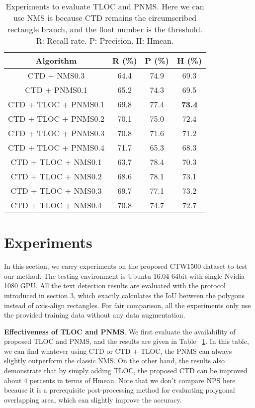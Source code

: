 \documentclass[10pt,twocolumn,letterpaper]{article}
\begin{document}
\begin{table}[!t]
\caption{Experiments to evaluate TLOC and PNMS. Here we can use NMS is because CTD remains the circumscribed rectangle branch, and the float number is the threshold. R: Recall rate. P: Precision. H: Hmean. }
\label{tab:tloc}
\centering
\normalsize
\begin{tabular}{cccc}
  \toprule
  Algorithm & R (\%)  & P (\%) & H (\%) \\
  \bottomrule
  CTD + NMS0.3 & 64.4 & 74.9 & 69.3 \\
  \hline
  CTD + PNMS0.1 & 65.2 & 74.3 & 69.5 \\
  \hline
  CTD + TLOC + PNMS0.1 & 69.8 & 77.4 & {\bf{73.4}} \\
  \hline
  CTD + TLOC + PNMS0.2 & 70.1 & 75.0 & 72.4 \\
  \hline
  CTD + TLOC + PNMS0.3 & 70.8 & 71.6 & 71.2 \\
  \hline
  CTD + TLOC + PNMS0.4 & 71.7 & 65.3 & 68.3 \\
  \hline
  CTD + TLOC + NMS0.1 & 63.7 & 78.4 & 70.3 \\
  \hline
  CTD + TLOC + NMS0.2 & 68.6 & 78.1 & 73.1 \\
  \hline
  CTD + TLOC + NMS0.3 & 69.7 & 77.1 & 73.2 \\
  \hline
  CTD + TLOC + NMS0.4 & 70.8 & 74.7 & 72.7 \\
  \bottomrule
\end{tabular}
\end{table}

\section{Experiments}
In this section, we carry experiments on the proposed CTW1500 dataset to test our method.
The testing environment is Ubuntu 16.04 64bit with single Nvidia 1080 GPU. All the text detection results are evaluated with the protocol introduced in section 3, which exactly calculates the IoU between the polygons instead of axis-align rectangles. For fair comparison, all the experiments only use the provided training data without any data augmentation. 

{\bf{Effectiveness of TLOC and PNMS}}. We first evaluate the availability of proposed TLOC and PNMS, and the results are given in Table ~\ref{tab:tloc}. In this table, we can find whatever using CTD or CTD + TLOC, the PNMS can always slightly outperform the classic NMS. On the other hand, the results also demonstrate that by simply adding TLOC, the proposed CTD can be improved about 4 percents in terms of Hmean. Note that we don't compare NPS here because it is a prerequisite post-processing method for evaluating polygonal overlapping area, which can slightly improve the accuracy.
\end{document}
